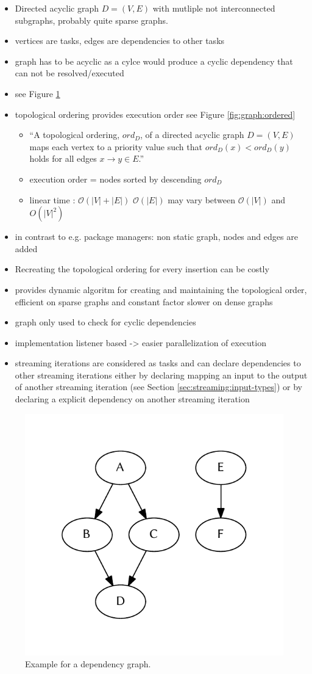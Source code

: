 	\begin{itemize}
		\item Directed acyclic graph $D=(V,E)$ with mutliple not interconnected subgraphs, probably quite sparse graphs.
		\item vertices are tasks, edges are dependencies to other tasks
		\item graph has to be acyclic as a cylce would produce a cyclic dependency that can not be resolved/executed
		\item see Figure \ref{fig:graph:unordered}
		\item topological ordering provides execution order see Figure \ref{fig:graph:ordered}
		\begin{itemize}
			\item ``A topological ordering, $ord_D$, of a directed acyclic graph $D = (V, E)$ maps each vertex to a priority value such that $ord_{D}(x) < ord_{D}(y)$ holds for all edges $x \rightarrow y \in E$.'' \citep{pearce2007dynamic}
			\item execution order = nodes sorted by descending $ord_D$
		 	\item linear time \citep{cormen2001introduction}: $\mathcal O(|V|+|E|)$  $\mathcal O(|E|)$ may vary between $\mathcal O(|V|)$ and  $O(|V|^2)$
		 \end{itemize}
		\item in contrast to e.g. package managers: non static graph, nodes and edges are added
		\item Recreating the topological ordering for every insertion can be costly \cite{pearce2007dynamic}
		\item \cite{pearce2007dynamic} provides dynamic algoritm for creating and maintaining the topological order, efficient on sparse graphs and constant factor slower on dense graphs
		\item graph only used to check for cyclic dependencies
		\item implementation listener based -> easier parallelization of execution
		\item streaming iterations are considered as tasks and can declare dependencies to other streaming iterations either by declaring mapping an input to the output of another streaming iteration (see Section \ref{sec:streaming:input-types}) or by declaring a explicit dependency on another streaming iteration
	\end{itemize}
	\begin{figure}[!htb]
		\centering
		\includegraphics[width=.4474\textwidth]{figures/unordered-graph.pdf} %
		\caption{\label{fig:graph:unordered} Example for a dependency graph.}
	\end{figure}
